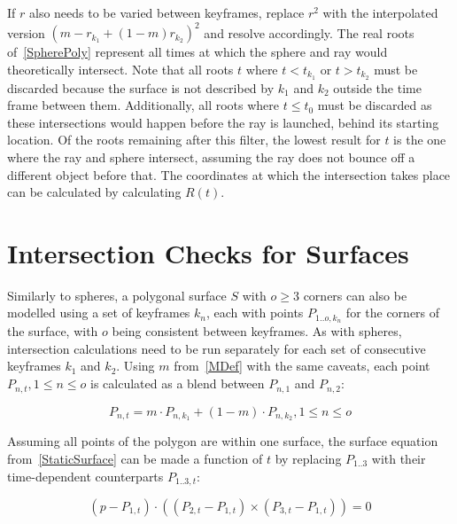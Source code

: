 If \(r\) also needs to be varied between keyframes,
replace \(r^2\) with the interpolated version \({(m - r_{k_1} + (1-m) r_{k_2})}^2\) and resolve accordingly.
\newline
The real roots of~\eqref{SpherePoly} represent all times at which the sphere and ray would theoretically intersect.
Note that all roots \(t\) where \(t < t_{k_1}\) or \(t > t_{k_2}\) must be discarded
because the surface is not described by \(k_1\) and \(k_2\) outside the time frame between them.
Additionally, all roots where \(t \le t_0\) must be discarded as these intersections would happen before the ray is launched,
behind its starting location.
\newline
Of the roots remaining after this filter, the lowest result for \(t\) is the one where the ray and sphere intersect,
assuming the ray does not bounce off a different object before that.
The coordinates at which the intersection takes place can be calculated by calculating \(R(t)\).

\section{Intersection Checks for Surfaces}\label{sec:IntersectSurface}

Similarly to spheres, a polygonal surface \(S\) with \(o \ge 3\) corners can also be modelled using a set of keyframes \(k_n\),
each with points \(P_{1..o, k_n}\) for the corners of the surface, with \(o\) being consistent between keyframes.
As with spheres, intersection calculations need to be run separately for each set of consecutive keyframes \(k_1\) and \(k_2\).
\newline
Using \(m\) from~\eqref{MDef} with the same caveats,
each point \(P_{n, t}, 1 \le n \le o\) is calculated as a blend between \(P_{n, 1}\) and \(P_{n, 2}\):

\begin{equation}\label{SurfacePointDef}
    P_{n, t} = m \cdot P_{n, k_1} + (1 - m) \cdot P_{n, k_2}, 1 \le n \le o
\end{equation}

Assuming all points of the polygon are within one surface,
the surface equation from~\eqref{StaticSurface} can be made a function of \(t\)
by replacing \(P_{1..3}\) with their time-dependent counterparts \(P_{1..3, t}\):

\begin{equation}\label{SurfaceDef}
    (p - P_{1, t}) \cdot ((P_{2, t} - P_{1, t}) \times (P_{3, t} - P_{1, t})) = 0
\end{equation}

